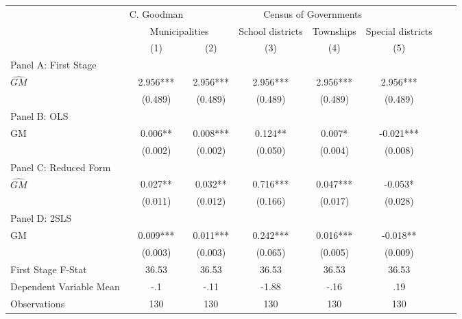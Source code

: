    \begin{tabular}{l*{7}{c}} \toprule
&\multicolumn{1}{c}{C. Goodman}&\multicolumn{4}{c}{Census of Governments}\\\cmidrule(lr){2-2}\cmidrule(lr){3-6}
&\multicolumn{2}{c}{Municipalities}&\multicolumn{1}{c}{School districts}&\multicolumn{1}{c}{Townships}&\multicolumn{1}{c}{Special districts}\\\cmidrule(lr){2-3}\cmidrule(lr){4-6}
&\multicolumn{1}{c}{(1)}&\multicolumn{1}{c}{(2)}&\multicolumn{1}{c}{(3)}&\multicolumn{1}{c}{(4)}&\multicolumn{1}{c}{(5)}\\
\cmidrule(lr){1-6}
\multicolumn{5}{l}{Panel A: First Stage}\\
\cmidrule(lr){1-6}
$\widehat{GM}$  &    2.956***&    2.956***&    2.956***&    2.956***&    2.956***\\
                &  (0.489)   &  (0.489)   &  (0.489)   &  (0.489)   &  (0.489)   \\
\cmidrule(lr){1-6}
\multicolumn{5}{l}{Panel B: OLS}\\
\cmidrule(lr){1-6}
GM              &    0.006** &    0.008***&    0.124** &    0.007*  &   -0.021***\\
                &  (0.002)   &  (0.002)   &  (0.050)   &  (0.004)   &  (0.008)   \\
\cmidrule(lr){1-6}
\multicolumn{5}{l}{Panel C: Reduced Form}\\
\cmidrule(lr){1-6}
$\widehat{GM}$  &    0.027** &    0.032** &    0.716***&    0.047***&   -0.053*  \\
                &  (0.011)   &  (0.012)   &  (0.166)   &  (0.017)   &  (0.028)   \\
\cmidrule(lr){1-6}
\multicolumn{5}{l}{Panel D: 2SLS}\\
\cmidrule(lr){1-6}
GM              &    0.009***&    0.011***&    0.242***&    0.016***&   -0.018** \\
                &  (0.003)   &  (0.003)   &  (0.065)   &  (0.005)   &  (0.009)   \\
\midrule
First Stage F-Stat&    36.53   &    36.53   &    36.53   &    36.53   &    36.53   \\
Dependent Variable Mean&      -.1   &     -.11   &    -1.88   &     -.16   &      .19   \\
Observations    &      130   &      130   &      130   &      130   &      130   \\
       \bottomrule \end{tabular}
